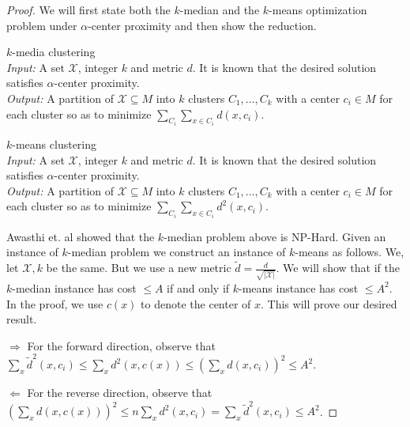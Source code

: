 \documentclass[11pt]{article}
\newcommand{\mc}{\mathcal}
\begin{document}
\begin{proof}
We will first state both the $k$-median and the $k$-means optimization problem under $\alpha$-center proximity and then show the reduction.

\vspace{1em}\noindent $k$-media clustering\\
{\it Input:} A set $\mc X$, integer $k$ and metric $d$. It is known that the desired solution satisfies $\alpha$-center proximity.\\
{\it Output:} A partition of $\mc X \subseteq M$ into $k$ clusters $C_1, \ldots, C_k$ with a center $c_i \in M$ for each cluster so as to minimize $\sum_{C_i}\sum_{x \in C_i} d(x, c_i)$.  

\vspace{0.5em}\noindent $k$-means clustering\\
{\it Input:} A set $\mc X$, integer $k$ and metric $d$. It is known that the desired solution satisfies $\alpha$-center proximity.\\
{\it Output:} A partition of $\mc X \subseteq M$ into $k$ clusters $C_1, \ldots, C_k$ with a center $c_i \in M$ for each cluster so as to minimize $\sum_{C_i}\sum_{x \in C_i} d^2(x, c_i)$.  

\vspace{1em}\noindent Awasthi et. al \cite{awasthi2012center} showed that the $k$-median problem above is NP-Hard. Given an instance of $k$-median problem we construct an instance of $k$-means as follows. We, let $\mc X, k$ be the same. But we use a new metric $\tilde d = \frac{d}{\sqrt{|\mc X|}}$. We will show that if the $k$-median instance has cost $\le A$ if and only if $k$-means instance has cost $\le A^2$. In the proof, we use $c(x)$ to denote the center of $x$. This will prove our desired result.

\noindent$\Rightarrow$ For the forward direction, observe that $\sum_x \tilde d^{2}(x, c_i) \le\sum_{x}d^2(x, c(x)) \le (\sum_{x} d(x, c_i))^2 \le A^2$.

\noindent$\Leftarrow$ For the reverse direction, observe that $(\sum_{x}d(x, c(x)))^2 \le n\sum_{x} d^2(x, c_i) = \sum_x \tilde d^{2}(x, c_i) \le A^2$.
\end{proof}









 
\end{document}
